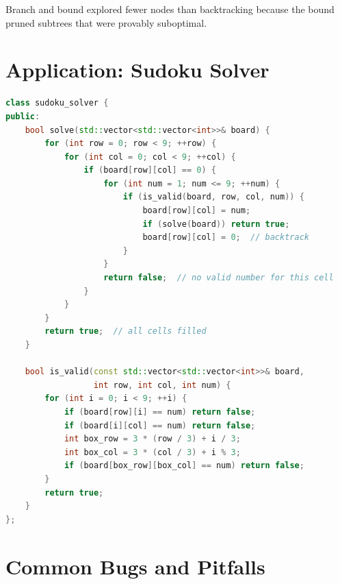 Branch and bound explored fewer nodes than backtracking because the bound pruned subtrees that were provably suboptimal.
\section{Application: Sudoku Solver}

\begin{lstlisting}[language=C++]
class sudoku_solver {
public:
    bool solve(std::vector<std::vector<int>>& board) {
        for (int row = 0; row < 9; ++row) {
            for (int col = 0; col < 9; ++col) {
                if (board[row][col] == 0) {
                    for (int num = 1; num <= 9; ++num) {
                        if (is_valid(board, row, col, num)) {
                            board[row][col] = num;
                            if (solve(board)) return true;
                            board[row][col] = 0;  // backtrack
                        }
                    }
                    return false;  // no valid number for this cell
                }
            }
        }
        return true;  // all cells filled
    }

    bool is_valid(const std::vector<std::vector<int>>& board,
                  int row, int col, int num) {
        for (int i = 0; i < 9; ++i) {
            if (board[row][i] == num) return false;
            if (board[i][col] == num) return false;
            int box_row = 3 * (row / 3) + i / 3;
            int box_col = 3 * (col / 3) + i % 3;
            if (board[box_row][box_col] == num) return false;
        }
        return true;
    }
};
\end{lstlisting}

\section{Common Bugs and Pitfalls}

